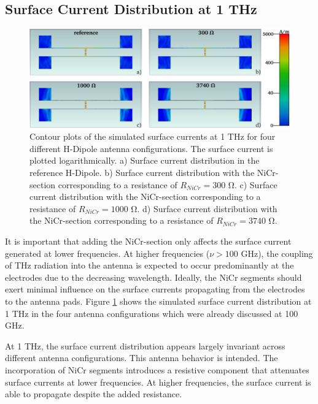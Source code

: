 \subsection{Surface Current Distribution at 1 THz}

\begin{figure}[!]
    \centering
    \includegraphics[width=\linewidth]{figures/Contour_Plots_v2/1Thz_SC_sim_plots.pdf}
    \caption{Contour plots of the simulated surface currents at \num{1} \si{\tera \hertz} for four different H-Dipole antenna configurations. The surface current is plotted logarithmically. a) Surface current distribution in the reference H-Dipole. b) Surface current distribution with the NiCr-section corresponding to a resistance of $R_{NiCr} = 300$ \si{\ohm}. c) Surface current distribution with the NiCr-section corresponding to a resistance of $R_{NiCr} = 1000$ \si{\ohm}. d) Surface current distribution with the NiCr-section corresponding to a resistance of $R_{NiCr} = 3740$ \si{\ohm}.}
    \label{sc_1thz_comp}
\end{figure}

It is important that adding the NiCr-section only affects the surface current generated at lower frequencies. At higher frequencies ($\nu > 100$ \si{\giga \hertz}), the coupling of THz radiation into the antenna is expected to occur predominantly at the electrodes due to the decreasing wavelength. Ideally, the NiCr segments should exert minimal influence on the surface currents propagating from the electrodes to the antenna pads. Figure \ref{sc_1thz_comp} shows the simulated surface current distribution at \num{1} \si{\tera \hertz} in the four antenna configurations which were already discussed at \num{100} \si{\giga \hertz}. 

At \num{1} \si{\tera \hertz}, the surface current distribution appears largely invariant across different antenna configurations. This antenna behavior is intended. The incorporation of NiCr segments introduces a resistive component that attenuates surface currents at lower frequencies. At higher frequencies, the surface current is able to propagate despite the added resistance. 

